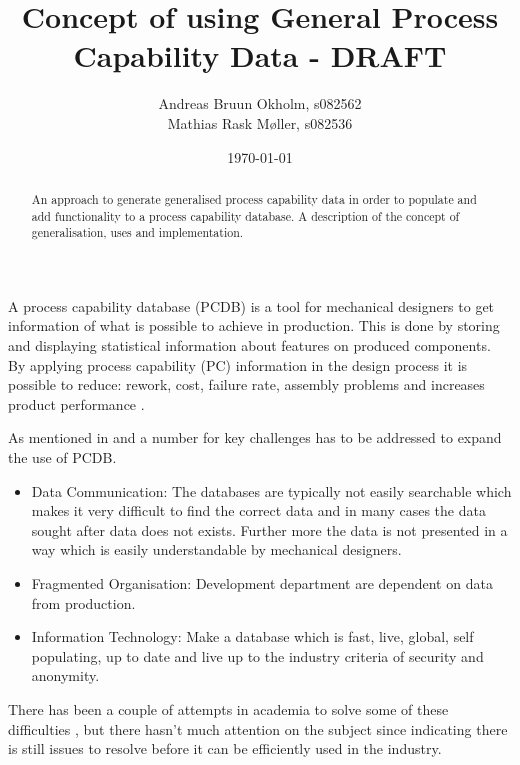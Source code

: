 \documentclass[aip,amsmath, reprint, author-year]{revtex4-1}
\begin{document}
\begin{abstract}
An approach to generate generalised process capability data in order to populate and add functionality to a process capability database.
A description of the concept of generalisation, uses and implementation.
\end{abstract}

\title{Concept of using General Process Capability Data - DRAFT}
\author{Andreas Bruun Okholm, s082562\\
Mathias Rask Møller, s082536 }
 
\date{\today}
\maketitle


A process capability database (PCDB) is a tool for mechanical designers to get information of what is possible to achieve in production. This is done by storing and displaying statistical information about features on produced components.  
By applying process capability (PC) information in the design process it is possible to reduce: rework, cost, failure rate, assembly problems and increases product performance \citep{tata1999process}.

As mentioned in \citep{tata1999process, tata1999effective, raskokholm} and a number for key challenges has to be addressed to expand the use of PCDB.
\begin{itemize}
	\item Data Communication: The databases are typically not easily searchable which makes it very difficult to find the correct data and in many cases the data sought after data does not exists. Further more the data is not presented in a way which is easily understandable by mechanical designers.
	\item Fragmented Organisation: Development department are dependent on data from production. 
	\item Information Technology: Make a database which is fast, live, global, self populating, up to date and live up to the industry criteria of security and anonymity.
\end{itemize}

There has been a couple of attempts in academia to solve some of these difficulties \citep{thornton2000use, kern2003forecasting, thornton2004variation}, but there hasn't much attention on the subject since indicating there is still issues to resolve before it can be efficiently used in the industry.
\end{document}
